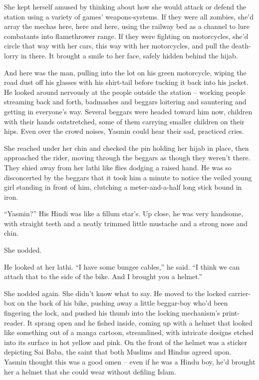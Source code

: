 She kept herself amused by thinking about how she would attack or
defend the station using a variety of games' weapons-systems. If
they were all zombies, she'd array the mechas here, here and here,
using the railway bed as a channel to lure combatants into
flamethrower range. If they were fighting on motorcycles, she'd
circle that way with her cars, this way with her motorcycles, and
pull the death-lorry in there. It brought a smile to her face,
safely hidden behind the hijab.

And here was the man, pulling into the lot on his green motorcycle,
wiping the road dust off his glasses with his shirt-tail before
tucking it back into his jacket. He looked around nervously at the
people outside the station -- working people streaming back and
forth, badmashes and beggars loitering and sauntering and getting
in everyone's way. Several beggars were headed toward him now,
children with their hands outstretched, some of them carrying
smaller children on their hips. Even over the crowd noises, Yasmin
could hear their sad, practiced cries.

She reached under her chin and checked the pin holding her hijab in
place, then approached the rider, moving through the beggars as
though they weren't there. They shied away from her lathi like
flies dodging a raised hand. He was so disconcerted by the beggars
that it took him a minute to notice the veiled young girl standing
in front of him, clutching a meter-and-a-half long stick bound in
iron.

``Yasmin?'' His Hindi was like a fillum star's. Up close, he was very
handsome, with straight teeth and a neatly trimmed little mustache
and a strong nose and chin.

She nodded.

He looked at her lathi. ``I have some bungee cables,'' he said. ``I
think we can attach that to the side of the bike. And I brought you
a helmet.''

She nodded again. She didn't know what to say. He moved to the
locked carrier-box on the back of his bike, pushing away a little
beggar-boy who'd been fingering the lock, and pushed his thumb into
the locking mechanism's print-reader. It sprang open and he fished
inside, coming up with a helmet that looked like something out of a
manga cartoon, streamlined, with intricate designs etched into its
surface in hot yellow and pink. On the front of the helmet was a
sticker depicting Sai Baba, the saint that both Muslims and Hindus
agreed upon. Yasmin thought this was a good omen -- even if he was
a Hindu boy, he'd brought her a helmet that she could wear without
defiling Islam.

